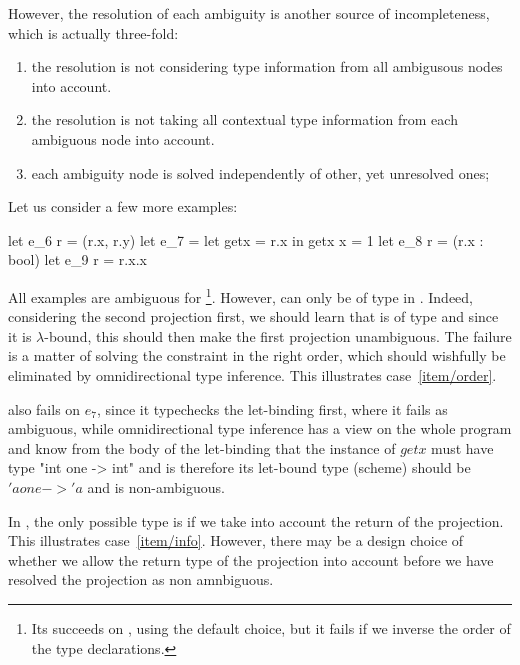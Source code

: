 \documentclass[acmsmall,screen,nonacm]{acmart}
\begin{document}
However, the resolution of each ambiguity is another source of
incompleteness, which is actually three-fold:
\begin{enumerate}
\item\label {item/order}
  the resolution is not considering type information from all ambigusous
  nodes into account.
\item\label {item/info}
  the resolution is not taking all contextual type information from
  each ambiguous node into account.
\item\label {item/simultaneous}
  each ambiguity node is solved independently of other, yet unresolved ones;
\end{enumerate}
Let us consider a few more examples:
\begin{program}[error]
let e_6 r = (r.x, r.y)
let e_7 = let getx = r.x in getx {x = 1}
let e_8 r = (r.x : bool)
let e_9 r = r.x.x
\end{program}
All examples are ambiguous for \OCaml\footnote{Its succeeds on ,
using the default choice, but it fails if we inverse the order of the type
declarations.}.  However,  can only be of type
 in . Indeed, considering the second projection first,
we should learn that  is of type  and since it is
$\lambda$-bound, this should then make the first projection unambiguous.
The failure is a matter of solving the constraint in the right order, which
should wishfully be eliminated by omnidirectional type inference.
This illustrates case~\ref {item/order}.

\OCaml also fails on \ocaml$e_7$, since it typechecks the let-binding first,
where it fails as ambiguous, while omnidirectional type inference
has a view on the whole program and know from the body of the let-binding
that the instance of $getx$ must have type \ocaml"int one -> int" and is
therefore its let-bound type (scheme) should be \ocaml$'a one -> 'a$ and is
non-ambiguous.

In , the only possible type is  if we take into account
the return of the projection. This illustrates case~\ref {item/info}.
However, there may be a design choice of whether we allow the return type of
the projection into account before we have resolved the projection as non
amnbiguous.
\end{document}
